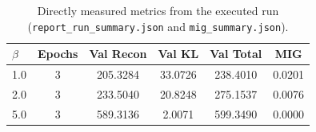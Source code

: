 \begin{table}[H]
\centering
\begin{tabular}{@{}lccccc@{}}
\toprule
\textbf{$\beta$} & \textbf{Epochs} & \textbf{Val Recon} & \textbf{Val KL} & \textbf{Val Total} & \textbf{MIG} \\ \midrule
1.0 & 3 & 205.3284 & 33.0726 & 238.4010 & 0.0201 \\
2.0 & 3 & 233.5040 & 20.8248 & 275.1537 & 0.0076 \\
5.0 & 3 & 589.3136 & 2.0071 & 599.3490 & 0.0000 \\
\bottomrule
\end{tabular}
\caption{Directly measured metrics from the executed run (\texttt{report\_run\_summary.json} and \texttt{mig\_summary.json}).}
\label{tab:latent_analysis}
\end{table}
